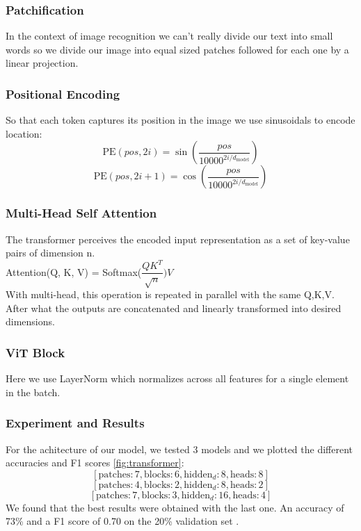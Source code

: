 \subsubsection{Patchification}
In the context of image recognition we can't really divide our text into small words so we divide our image into equal sized patches followed for each one by a linear projection. 

\subsubsection{Positional Encoding}
So that each token captures its position in the image we use sinusoidals to encode location: \\ 
$$\text{PE}(pos, 2i) = \sin(\frac{pos}{10000^{2i/d_{\text{model}}}})$$ $$\text{PE}(pos, 2i+1) = \cos(\frac{pos}{10000^{2i/d_{\text{model}}}})$$

\subsubsection{Multi-Head Self Attention}
The transformer perceives the encoded input representation as a set of key-value pairs of dimension n. \\
Attention(Q, K, V) = Softmax($\dfrac{QK^T}{\sqrt{n}})V$ \\
With multi-head, this operation is repeated in parallel with the same Q,K,V. After what the outputs are concatenated and linearly transformed into desired dimensions. 



\subsubsection{ViT Block}
Here we use LayerNorm which normalizes across all features for a single element in the batch. 
\subsubsection{Experiment and Results}
For the achitecture of our model, we tested 3 models and we plotted the different accuracies and F1 scores \cref{fig:transformer}:
$$[\text{patches}: 7, \text{blocks}: 6, \text{hidden}_d: 8, \text{heads}: 8]$$
$$[\text{patches}: 4, \text{blocks}: 2, \text{hidden}_d: 8, \text{heads}: 2]$$
$$[\text{patches}: 7, \text{blocks}: 3, \text{hidden}_d: 16,\text{heads}: 4]$$
We found that the best results were obtained with the last one. An accuracy of 73\% and a F1 score of 0.70 on the 20\% validation set . 
